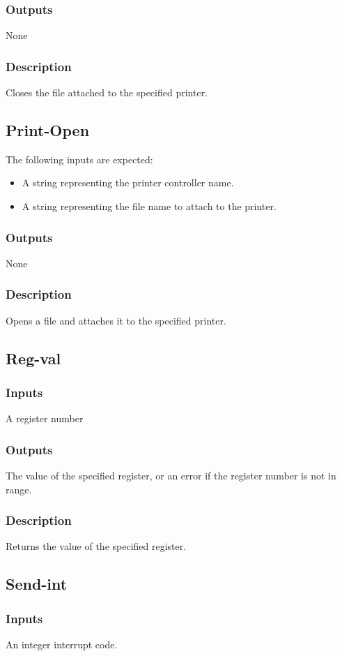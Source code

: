 \documentclass[10pt, openany]{book}
\begin{document}
\subsubsection{Outputs}
None
\subsubsection{Description}
Closes the file attached to the specified printer.

\subsection{Print-Open}
The following inputs are expected:
\begin{itemize}
  \item A string representing the printer controller name.
  \item A string representing the file name to attach to the printer.
\end{itemize}
\subsubsection{Outputs}
None
\subsubsection{Description}
Opens a file and attaches it to the specified printer.

\subsection{Reg-val}
\subsubsection{Inputs}
A register number
\subsubsection{Outputs}
The value of the specified register, or an error if the register number is not in range.
\subsubsection{Description}
Returns the value of the specified register.

\subsection{Send-int}
\subsubsection{Inputs}
An integer interrupt code.
\end{document}
